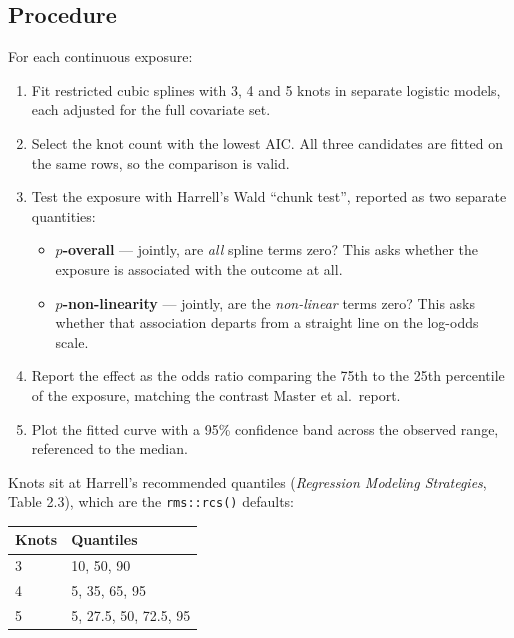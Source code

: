 \documentclass[11pt]{article}
\newcommand{\code}[1]{\texttt{\small #1}}
\begin{document}
\subsection{Procedure} For each continuous exposure:

\begin{enumerate}
\item Fit restricted cubic splines with 3, 4 and 5 knots in separate logistic
models, each adjusted for the full covariate set.
\item Select the knot count with the lowest AIC. All three candidates are fitted
on the same rows, so the comparison is valid.
\item Test the exposure with Harrell's Wald ``chunk test'', reported as two
separate quantities:
\begin{itemize}
\item \textbf{$p$-overall} --- jointly, are \emph{all} spline terms zero? This
asks whether the exposure is associated with the outcome at all.
\item \textbf{$p$-non-linearity} --- jointly, are the \emph{non-linear} terms
zero? This asks whether that association departs from a straight line on the
log-odds scale.
\end{itemize}
\item Report the effect as the odds ratio comparing the 75th to the 25th
percentile of the exposure, matching the contrast Master et al.\ report.
\item Plot the fitted curve with a 95\% confidence band across the observed
range, referenced to the median.
\end{enumerate}

Knots sit at Harrell's recommended quantiles (\emph{Regression Modeling
Strategies}, Table 2.3), which are the \code{rms::rcs()} defaults:

\begin{table}[h]
\centering
\begin{tabular}{@{}l l@{}}
\toprule
\textbf{Knots} & \textbf{Quantiles} \\
\midrule
3 & 10, 50, 90 \\
4 & 5, 35, 65, 95 \\
5 & 5, 27.5, 50, 72.5, 95 \\
\bottomrule
\end{tabular}
\end{table}
\end{document}
